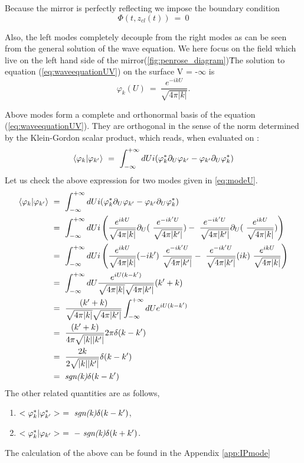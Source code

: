  
 Because the mirror is perfectly reflecting we impose the boundary condition
 \begin{equation}\label{eq:bc}
    \Phi(t,z_{cl}(t))~=~0    
 \end{equation}

 Also, the left modes completely decouple from the right modes as can be seen from the general solution of the wave equation. We here focus on the field which live on the left hand side of the mirror(\ref{fig:penrose_diagram})\. The solution to equation (\ref{eq:waveequationUV}) on the surface V = -$\infty$ is 
 \begin{equation}\label{eq:modeU}
    \varphi_k(U)~=~\frac{e^{-i k U}}{\sqrt{4\pi|k|}}.
 \end{equation}

 Above modes form a complete and orthonormal basis of the equation (\ref{eq:waveequationUV}). They are orthogonal in the sense of the norm determined by the Klein-Gordon scalar product, which reads, when evaluated on \scrim :
 \begin{equation}\label{eq:KG_inner_product}
    \braket{\varphi_k|\varphi_{k'}}~=~\int^{+\infty}_{-\infty}dU i(\varphi^*_k\partial_U\varphi_{k'}-\varphi_{k'}\partial_U\varphi^*_k)
 \end{equation}
Let us check the above expression for two modes given in \ref{eq:modeU}.
\begin{equation}\label{eq:orthorr}
\begin{aligned}
     \braket{\varphi_k|\varphi_{k'}}~&=~\int^{+\infty}_{-\infty}dU i(\varphi^*_k\partial_U\varphi_{k'}-\varphi_{k'}\partial_U\varphi^*_k)\\
    &=~\int^{+\infty}_{-\infty}dU i\left(\frac{e^{i k U}}{\sqrt{4\pi|k|}}\partial_U(~\frac{e^{-i k' U}}{\sqrt{4\pi|k'|}})-~\frac{e^{-i k' U}}{\sqrt{4\pi|k'|}}\partial_U(~\frac{e^{i k U}}{\sqrt{4\pi|k|}})\right)\\
    &=~\int^{+\infty}_{-\infty}dU i\left(\frac{e^{i k U}}{\sqrt{4\pi|k|}}(-ik')~\frac{e^{-i k' U}}{\sqrt{4\pi|k'|}}-~\frac{e^{-i k' U}}{\sqrt{4\pi|k'|}}(ik)~\frac{e^{i k U}}{\sqrt{4\pi|k|}}\right)\\
    &=~\int^{+\infty}_{-\infty}dU\frac{e^{iU(k-k')}}{\sqrt{4\pi|k|}\sqrt{4\pi|k'|}}(k'+k)\\
    &=~\frac{(k'+k)}{\sqrt{4\pi|k|}\sqrt{4\pi|k'|}}\int^{+\infty}_{-\infty}dU e^{iU(k-k')}\\
    &=~\frac{(k'+k)}{4\pi\sqrt{|k||k'|}}2\pi\delta(k-k')\\
    &=~\frac{2k}{2\sqrt{|k||k'|}}\delta(k-k')\\
    &=~\emph{sgn(k)}\delta(k-k')
\end{aligned}
\end{equation}
The other related quantities are as follows,
\begin{enumerate}
    \item $<\varphi^*_k|\varphi^*_{k'}>~=~\emph{sgn(k)}\delta(k-k')$,
    \item $<\varphi^*_k|\varphi_{k'}>~=~-~\emph{sgn(k)}\delta(k+k')$.
\end{enumerate}
The calculation of the above can be found in the Appendix \ref{app:IPmode}


